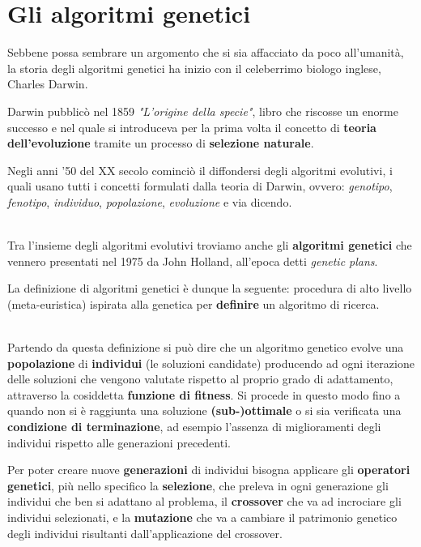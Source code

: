 \documentclass[a4paper, 11pt, oneside]{report}
\begin{document}
            \section{Gli algoritmi genetici}
            Sebbene possa sembrare un argomento che si sia affacciato da poco all'umanità, la storia degli algoritmi genetici
            ha inizio con il celeberrimo biologo inglese, Charles Darwin.
            \par \noindent Darwin pubblicò nel 1859 \textit{"L'origine della specie"}, libro che riscosse un enorme
            successo e nel quale si introduceva per la prima volta il concetto di \textbf{teoria dell'evoluzione} tramite
            un processo di \textbf{selezione naturale}.
            \par \noindent Negli anni '50 del XX secolo cominciò il diffondersi degli algoritmi evolutivi,
            i quali usano tutti i concetti formulati dalla teoria di Darwin, ovvero:
            \textit{genotipo}, \textit{fenotipo}, \textit{individuo}, \textit{popolazione}, \textit{evoluzione} e via dicendo.
            \par \noindent
            \\ \noindent Tra l'insieme degli algoritmi evolutivi troviamo anche gli \textbf{algoritmi genetici} che vennero
            presentati nel 1975 da John Holland, all'epoca detti \textit{genetic plans}.
            \par \noindent La definizione di algoritmi genetici è dunque la seguente:
            procedura di alto livello (meta-euristica) ispirata alla genetica per \textbf{definire}
            un algoritmo di ricerca.
            \par \noindent
            \\ \noindent Partendo da questa definizione si può dire che un algoritmo genetico evolve una \textbf{popolazione}
            di \textbf{individui} (le soluzioni candidate) producendo ad ogni iterazione delle
            soluzioni che vengono valutate rispetto al proprio grado di adattamento, attraverso la cosiddetta
            \textbf{funzione di fitness}. Si procede in questo modo fino a quando non si è raggiunta
            una soluzione \textbf{(sub-)ottimale} o si sia verificata una \textbf{condizione di terminazione}, ad esempio
            l'assenza di miglioramenti degli individui rispetto alle generazioni precedenti.
            \par \noindent Per poter creare nuove \textbf{generazioni} di individui bisogna applicare gli \textbf{operatori genetici},
            più nello specifico la \textbf{selezione}, che preleva in ogni generazione gli individui che ben si
            adattano al problema, il \textbf{crossover} che va ad incrociare gli individui selezionati, e la \textbf{mutazione} che
            va a cambiare il patrimonio genetico degli individui risultanti dall'applicazione del crossover.
\end{document}
